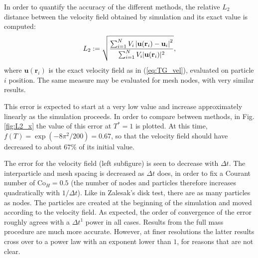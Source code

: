 \documentclass{ws-ijcm}
\newcommand{\bfr}{\mathbf{r}}
\newcommand{\bfu}{\mathbf{u}}
\begin{document}


In order to quantify the accuracy of the different methods, 
the relative $L_2$ distance between the velocity field obtained by
simulation and its exact value is computed:
\begin{equation}
\label{eq:L2_error}
L_2:=
\sqrt{%
  \frac{
    \sum_{i=1}^N 
    V_i
    \left|
      \bfu(\bfr_i) - \bfu_i
    \right|^2
  }{
    \sum_{i=1}^N 
    V_i
    |\bfu(\bfr_i)|^2
  }
} ,
\end{equation}
where $\bfu(\bfr_i)$ is the exact velocity field as in
(\ref{eq:TG_vel}), evaluated on particle $i$ position. The same
measure may be evaluated for mesh nodes, with very similar
results.

This error is expected to start at a very low value and increase
approximately linearly as the simulation proceeds. In order to compare
between methods, in Fig. \ref{fig:L2_x} the value of this error at
$T^*=1$ is plotted.  At this time, $f(T)=\exp(-8\pi^2 / 200 )=0.67 $,
so that the velocity field should have decreased to about $67\%$ of
its initial value.

The error for the velocity field (left subfigure) is seen to decrease
with $\Delta t$. The interparticle and mesh spacing is decreased as
$\Delta t$ does, in order to fix a Courant number of Co$_H=0.5$ (the
number of nodes and particles therefore increases quadratically with
$1/\Delta t$).
Like in Zalesak's disk test, there are as many particles as nodes. The
particles are created at the beginning of the simulation and moved
according to the velocity field. As expected, the order of convergence
of the error roughly agrees with a $\Delta t^1$ power in all cases.
Results from the full mass procedure are much more accurate. However,
at finer resolutions the latter results cross over to a power law with an
exponent lower than $1$, for reasons that are not clear.
\end{document}
